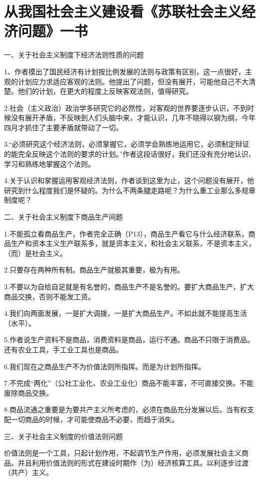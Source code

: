 \section[从我国社会主义建设看《苏联社会主义经济问题》一书（一九五八年）]{从我国社会主义建设看《苏联社会主义经济问题》一书}


一、关于社会主义制度下经济法则性质的问题

1、作者摸出了国民经济有计划按比例发展的法则与政策有区别，这一点很好，主观的计划应力求适应客观的法则。他提出了问题，但没有展开，可能他自己不大清楚。他们的计划，在更大的程度上反映客观法则，值得研究。

2.社会（主义政治）政治学多研究它的必然性，对客观的世界要逐步认识，不到时候没有展开矛盾，不反映到人们头脑中来，才能认识，几年不晓得以钢为纲，今年四月才抓住了主要矛盾就带动了一切。

3.“必须研究这个经济法则，必须掌握它，必须学会熟练地运用它，必须制定辩证的能完全反映这个法则的要求的计划。”作者这段话很好，我们还没有充分地认识、学习和熟练地掌握这个法则。

4.关于认识和掌握运用客观经济法则，作者谈到这里为止，这个问题没有展开，他研究到什么程度我们是怀疑的。为什么不两条腿走路呢？为什么重工业那么多规章制度呢？

二、关于社会主义制度下商品生产间题

1.不能孤立看商品生产，作者完全正确（P13），商品生产看它与什么经济联系，商品生产和资本主义生产联系多，就是资本主义，和社会主义联系，不是资本主义，（而）是社会主义。

2.只要存在两种所有制。商品生产就极其重要，极为有用。

3.不要以为自给自足就是有名誉的，商品生产不是名誉的。要扩大商品生产，扩大商品交换，否则不能发工资。

4.我们向两面发展，一是扩大调拨，一是扩大商品生产。不如此就不能提高生活（水平）。

5.作者说生产资料不是商品，消费资料是商品，运行不通。商品不只限于消费品。还有农业工具，手工业工具也是商品。

6.我们现在之商品生产不为价值法则所指挥。而是为计划所指挥。

7.不完成“两化”（公社工业化、农业工业化）商品不能丰富，不可直接交换。不能废除商品交换。

8.商品流通之重要是为要共产主义所考虑的，必须在商品充分发展以后。当有权支配一切商品的时候，才可能使商品不必要，而趋于消失。

三、关子社会主义制度的价值法则问题

价值法则是一个工具，只起计划作用，不起调节生产作用，必须发展社会主义商品。并且利用价值法则的形式在建设时期作（为）经济核算工具。以利逐步过渡（共产）主义。

